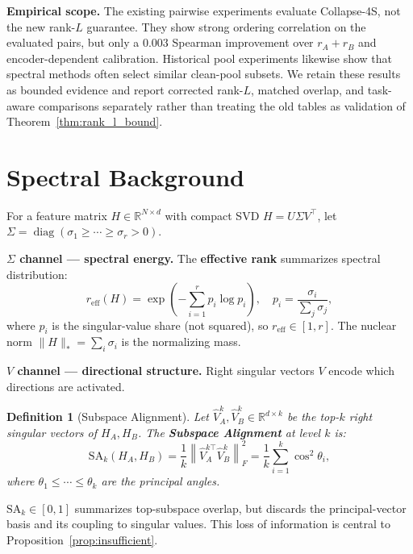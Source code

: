 \documentclass{article}
\newcommand{\reff}{\ensuremath{r_{\mathrm{eff}}}\xspace}
\newcommand{\SAk}{\ensuremath{\mathrm{SA}_k}\xspace}
\newcommand{\R}{\ensuremath{\mathbb{R}}}
\newcommand{\norm}[1]{\ensuremath{\left\lVert#1\right\rVert}}
\newtheorem{definition}{Definition}
\begin{document}
\textbf{Empirical scope.}
The existing pairwise experiments evaluate Collapse-4S, not the new
rank-$L$ guarantee.  They show strong ordering correlation on the evaluated
pairs, but only a $0.003$ Spearman improvement over $r_A{+}r_B$ and
encoder-dependent calibration.  Historical pool experiments likewise show
that spectral methods often select similar clean-pool subsets.  We retain
these results as bounded evidence and report corrected rank-$L$, matched
overlap, and task-aware comparisons separately rather than treating the old
tables as validation of Theorem~\ref{thm:rank_l_bound}.

\section{Spectral Background}
\label{sec:background}

For a feature matrix $H\in\R^{N\times d}$ with compact SVD
$H=U\Sigma V^\top$, let
$\Sigma=\operatorname{diag}(\sigma_1\geq\cdots\geq\sigma_r>0)$.

\textbf{$\Sigma$ channel --- spectral energy.}
The \textbf{effective rank} summarizes spectral distribution:
\begin{equation}
  \reff(H) = \exp\!\left(-\sum_{i=1}^r p_i \log p_i\right),
  \quad p_i = \frac{\sigma_i}{\sum_j \sigma_j},
  \label{eq:reff}
\end{equation}
where $p_i$ is the singular-value share (not squared), so $r_{\mathrm{eff}}\in[1,r]$.
The nuclear norm $\|H\|_*=\sum_i\sigma_i$ is the normalizing mass.

\textbf{$V$ channel --- directional structure.}
Right singular vectors $V$ encode which directions are activated.
\begin{definition}[Subspace Alignment]
\label{def:sa}
Let $\hat{V}_A^k,\hat{V}_B^k\in\R^{d\times k}$ be the top-$k$ right singular
vectors of $H_A,H_B$.
The \textbf{Subspace Alignment} at level $k$ is:
\begin{equation}
  \SAk(H_A,H_B) = \frac{1}{k}\norm{\hat{V}_A^{k\top}\hat{V}_B^k}_F^2
  = \frac{1}{k}\sum_{i=1}^k\cos^2\theta_i,
  \label{eq:sak}
\end{equation}
where $\theta_1\leq\cdots\leq\theta_k$ are the principal angles.
\end{definition}
$\SAk\in[0,1]$ summarizes top-subspace overlap, but discards the
principal-vector basis and its coupling to singular values.  This loss of
information is central to Proposition~\ref{prop:insufficient}.
\end{document}
